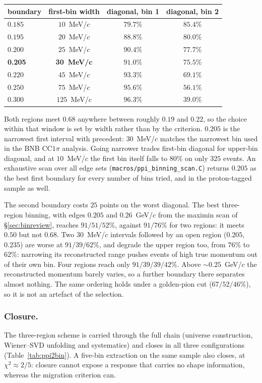 \documentclass[11pt,a4paper]{article}
\begin{document}
\begin{center}\small
\begin{tabular}{lccc}
\toprule
boundary & first-bin width & diagonal, bin 1 & diagonal, bin 2 \\\midrule
$0.185$ & $10$~MeV/$c$ & $79.7\%$ & $85.4\%$ \\
$0.195$ & $20$~MeV/$c$ & $88.8\%$ & $80.0\%$ \\
$0.200$ & $25$~MeV/$c$ & $90.4\%$ & $77.7\%$ \\
\textbf{0.205} & \textbf{30~MeV/}$\mathbf{c}$ & $\mathbf{91.0\%}$ & $\mathbf{75.5\%}$ \\
$0.220$ & $45$~MeV/$c$ & $93.3\%$ & $69.1\%$ \\
$0.250$ & $75$~MeV/$c$ & $95.6\%$ & $56.1\%$ \\
$0.300$ & $125$~MeV/$c$ & $96.3\%$ & $39.0\%$ \\
\bottomrule
\end{tabular}
\end{center}

\noindent Both regions meet $0.68$ anywhere between roughly $0.19$ and $0.22$, so the choice
within that window is set by width rather than by the criterion. $0.205$ is the narrowest
first interval with precedent: $30$~MeV/$c$ matches the narrowest bin used in the BNB CC$1\pi$
analysis. Going narrower trades first-bin diagonal for upper-bin diagonal, and at $10$~MeV/$c$
the first bin itself falls to $80\%$ on only $325$ events. An exhaustive scan over all edge
sets (\texttt{macros/ppi\_binning\_scan.C}) returns $0.205$ as the best first boundary for
every number of bins tried, and in the proton-tagged sample as well.

The second boundary costs $25$ points on the worst diagonal. The best three-region binning,
with edges $0.205$ and $0.26$~GeV/$c$ from the maximin scan of \S\ref{sec:binreview}, reaches
$91/51/52\%$, against $91/76\%$ for two regions: it meets $0.50$ but not $0.68$. Two
$30$~MeV/$c$ intervals followed by an open region ($0.205$, $0.235$) are worse at $91/39/62\%$,
and degrade the upper region too, from $76\%$ to $62\%$: narrowing its reconstructed range
pushes events of high true momentum out of their own bin. Four regions reach only
$91/39/39/42\%$. Above $\sim\!0.25$~GeV/$c$ the reconstructed momentum barely varies, so a
further boundary there separates almost nothing. The same ordering holds under a golden-pion
cut ($67/52/46\%$), so it is not an artefact of the selection.

\subsubsection{Closure.} The three-region scheme is carried through the full chain
(universe construction, Wiener--SVD unfolding and systematics) and closes in all three
configurations (Table~\ref{tab:ppi2bin}). A five-bin extraction on the same sample also
closes, at $\chi^2\approx2/5$: closure cannot expose a response that carries no shape
information, whereas the migration criterion can.
\end{document}
